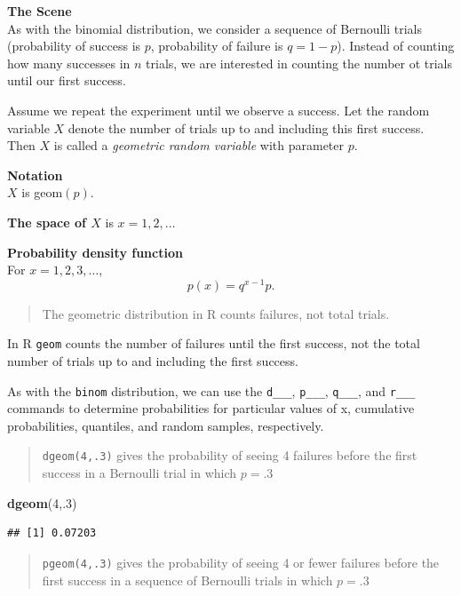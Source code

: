 \documentclass[
]{book}
\newenvironment{Shaded}{\begin{snugshade}}{\end{snugshade}}
\newcommand{\DecValTok}[1]{\textcolor[rgb]{0.00,0.00,0.81}{#1}}
\newcommand{\FunctionTok}[1]{\textcolor[rgb]{0.13,0.29,0.53}{\textbf{#1}}}
\newcommand{\NormalTok}[1]{#1}
\theoremstyle{definition}
\theoremstyle{definition}
\theoremstyle{definition}
\theoremstyle{definition}
\theoremstyle{remark}
\begin{document}
\textbf{The Scene}\\
As with the binomial distribution, we consider a sequence of Bernoulli trials (probability of success is \(p\), probability of failure is \(q = 1-p\)). Instead of counting how many successes in \(n\) trials, we are interested in counting the number ot trials until our first success.

Assume we repeat the experiment until we observe a success. Let the random variable \(X\) denote the number of trials up to and including this first success. Then \(X\) is called a \emph{geometric random variable} with parameter \(p\).

\textbf{Notation}\\
\(X\) is geom\((p)\).

\textbf{The space of \(X\)} is \(x = 1, 2, \ldots\)

\textbf{Probability density function}\\
For \(x = 1, 2, 3, \ldots\), \[p(x)= q^{x-1}p.\]

\begin{quote}
The geometric distribution in R counts failures, not total trials.
\end{quote}

In R \texttt{geom} counts the number of failures until the first success, not the total number of trials up to and including the first success.

As with the \texttt{binom} distribution, we can use the \texttt{d\_\_\_}, \texttt{p\_\_\_}, \texttt{q\_\_\_}, and \texttt{r\_\_\_} commands to determine probabilities for particular values of x, cumulative probabilities, quantiles, and random samples, respectively.

\begin{quote}
\texttt{dgeom(4,.3)} gives the probability of seeing 4 failures before the first success in a Bernoulli trial in which \(p = .3\)
\end{quote}

\begin{Shaded}
\begin{Highlighting}[]
\FunctionTok{dgeom}\NormalTok{(}\DecValTok{4}\NormalTok{,.}\DecValTok{3}\NormalTok{)}
\end{Highlighting}
\end{Shaded}

\begin{verbatim}
## [1] 0.07203
\end{verbatim}

\begin{quote}
\texttt{pgeom(4,.3)} gives the probability of seeing 4 or fewer failures before the first success in a sequence of Bernoulli trials in which \(p = .3\)
\end{quote}
\end{document}
